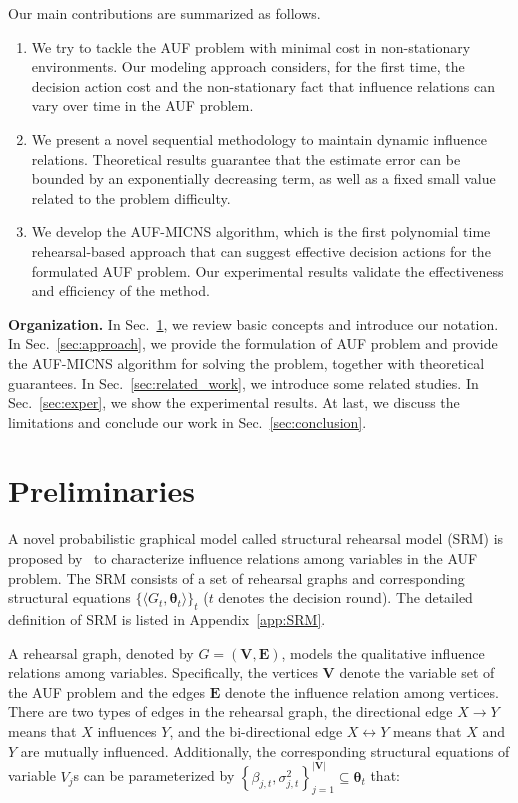 \documentclass{article}
\theoremstyle{plain}
\theoremstyle{definition}
\theoremstyle{remark}
\def \Sec {Sec.}
\def \E {\mathbf{E}}
\def \V {\mathbf{V}}
\def \V {\mathbf{V}}
\begin{document}
Our main contributions are summarized as follows.
\vspace{-0.7\baselineskip}
\begin{enumerate}[leftmargin=12pt, itemsep=-0.02in]
  \item 
  We try to tackle the AUF problem with minimal cost in non-stationary environments. 
  Our modeling approach considers, for the first time, the decision action cost and the non-stationary fact that influence relations can vary over time in the AUF problem.
  \item 
  We present a novel sequential methodology to maintain dynamic influence relations. 
  Theoretical results guarantee that the estimate error can be bounded by an exponentially decreasing term, as well as a fixed small value related to the problem difficulty. 
  \item 
  We develop the AUF-MICNS algorithm, which is the first polynomial time rehearsal-based approach that can suggest effective decision actions for the formulated AUF problem. 
  Our experimental results validate the effectiveness and efﬁciency of the method.
\end{enumerate}
\vskip -0.1in
\textbf{Organization.} In \Sec~\ref{sec:pre}, we review basic concepts and introduce our notation. In \Sec~\ref{sec:approach}, we provide the formulation of AUF problem and provide the AUF-MICNS algorithm for solving the problem, together with theoretical guarantees. 
In \Sec~\ref{sec:related_work}, we introduce some related studies. 
In \Sec~\ref{sec:exper}, we show the experimental results. At last, we discuss the limitations and conclude our work in \Sec~\ref{sec:conclusion}. 








\section{Preliminaries}
\label{sec:pre}

A novel probabilistic graphical model called structural rehearsal model (SRM) is proposed by~\citet{qint2023srm} to characterize influence relations among variables in the AUF problem. 
The SRM consists of a set of rehearsal graphs and corresponding structural equations $\{\langle G_t, \bm{\theta}_t\rangle\}_t$ ($t$ denotes the decision round). The detailed definition of SRM is listed in Appendix~\ref{app:SRM}. 


A rehearsal graph, denoted by $G = (\V, \E)$, models the qualitative influence relations among variables.
Specifically, the vertices $\V$ denote the variable set of the AUF problem and the edges $\E$ denote the influence relation among vertices.
There are two types of edges in the rehearsal graph, the directional edge $X\rightarrow Y$ means that $X$ influences $Y$, 
and the bi-directional edge $X\leftrightarrow Y$ means that $X$ and $Y$ are mutually influenced. 
Additionally, the corresponding structural equations of variable $V_j$s can be parameterized by $\left\{\beta_{j, t}, \sigma^2_{j, t}\right\}_{j=1}^{|\V|} \subseteq\bm{\theta}_t$ that:
\end{document}
